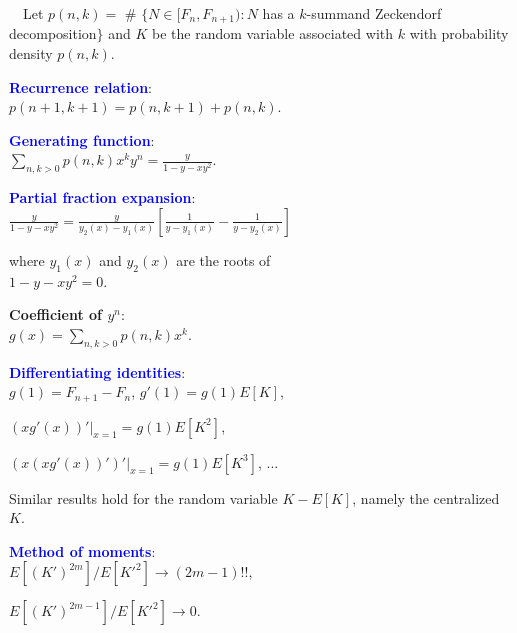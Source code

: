 \documentclass[landscape,final,columns=3]{baposter}
\begin{document}
\begin{poster}
{\begin{multicols}{2}
\ \ Let $p(n,k)=$ \# $\{N\in [F_n, F_{n+1}):N$ has a $k$-summand
Zeckendorf decomposition$\}$ and $K$ be the random variable associated with $k$ with probability density $p(n,k)$.


\begin{list}{}{\leftmargin=1em}

\vspace{-0.1in}

\item {{\textcolor{blue}{\bf{Recurrence relation}}}}:\\
$p(n+1,k+1)=p(n,k+1)+p(n,k)$.

\vspace{-0.02in}

\item {{\textcolor{blue}{\bf{Generating function}}}}: \\
$\sum_{n,k>0}p(n,k)x^ky^n =\frac{y}{1-y-xy^2}$.

\vspace{-0.02in}

\item {{\textcolor{blue}{\bf{Partial fraction expansion}}}}: \\
$\frac{y}{1-y-xy^2} =\frac{y}{y_2(x)-y_1(x)}\left[\frac{1}{y-y_1(x)}-\frac{1}{y-y_2(x)}\right]$

where $y_1(x)$ and $y_2(x)$ are the roots of\\
$1-y-xy^2=0$.

{\bf{Coefficient of $y^n$}}: \\
$g(x)=\sum_{n,k>0}p(n,k)x^k$.

\vspace{-0.02in}

\item {{\textcolor{blue}{\bf{Differentiating identities}}}}: \\
$g(1)=F_{n+1}-F_n$,  $g'(1)=g(1)E[K]$,

$\left(xg'(x)\right)'|_{x=1}=g(1)E[K^2]$,

$\left(x\left(xg'(x)\right)'\right)'|_{x=1}=g(1)E[K^3]$, ...

Similar results hold for the random variable $K-E[K]$, namely the centralized $K$.

\vspace{-0.02in}

\item {{\textcolor{blue}{\bf{Method of moments}}}}: \\
$E[(K')^{2m}]/E[K'^2]\rightarrow (2m-1)!!$,

$E[(K')^{2m-1}]/E[K'^2]\rightarrow 0$.
\end{list}

\vspace{0.1em}

\end{multicols}

}

\end{poster}%
%
\end{document}
